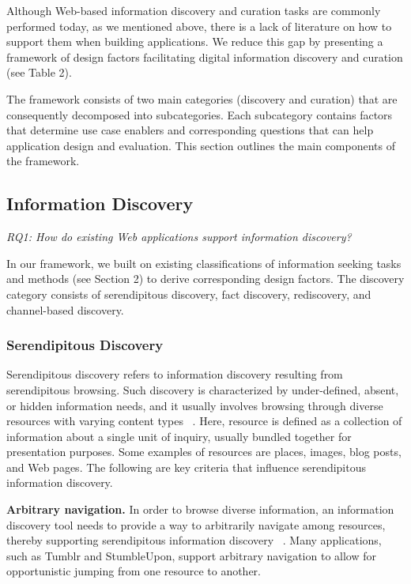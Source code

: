 \documentclass{casconpaper}
\begin{document}
{{Although Web-based information discovery and curation tasks are commonly performed today, as we mentioned above, there is a lack of literature on how to support them when building applications. We reduce this gap by presenting a framework of design factors facilitating digital information discovery and curation (see Table 2). 

The framework consists of two main categories (discovery and curation) that are consequently decomposed into subcategories. Each subcategory contains factors that determine use case enablers and corresponding questions that can help application design and evaluation. This section outlines the main components of the framework.

} %

{\subsection{Information Discovery}

\emph{RQ1: How do existing Web applications support information discovery?}

In our framework, we built on existing classifications of information seeking tasks and methods (see Section 2) to derive corresponding design factors. The discovery category consists of serendipitous discovery, fact discovery, rediscovery, and channel-based discovery. 
} %

{\subsubsection{Serendipitous Discovery}
Serendipitous discovery refers to information discovery resulting from serendipitous browsing. Such discovery is characterized by under-defined, absent, or hidden information needs, and it usually involves browsing through diverse resources with varying content types ~\cite{kellar2006, kellar2007}. Here, resource is defined as a collection of information about a single unit of inquiry, usually bundled together for presentation purposes. Some examples of resources are places, images, blog posts, and Web pages. The following are key criteria that influence serendipitous information discovery.

\textbf{Arbitrary navigation.} In order to browse diverse information, an information discovery tool needs to provide a way to arbitrarily navigate among resources, thereby supporting serendipitous information discovery ~\cite{foster}. Many applications, such as Tumblr and StumbleUpon, support arbitrary navigation to allow for opportunistic jumping from one resource to another. 

}}
\end{document}
